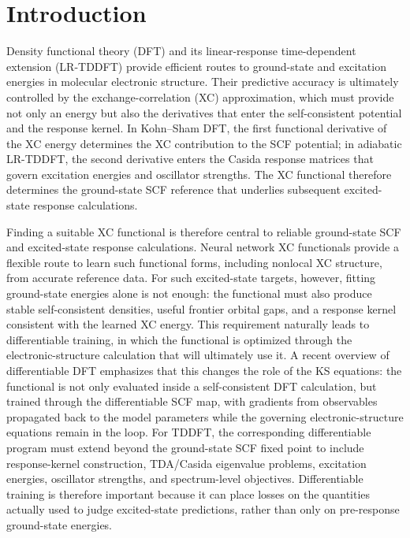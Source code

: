 \section{Introduction}

Density functional theory (DFT) and its linear-response
time-dependent extension (LR-TDDFT) provide efficient routes to
ground-state and excitation energies in molecular electronic
structure.\cite{HohenbergKohn1964,KohnSham1965,RungeGross1984,Casida1995}
Their predictive accuracy is ultimately controlled by the
exchange-correlation (XC) approximation, which must provide not
only an energy but also the derivatives that enter the
self-consistent potential and the response kernel. In Kohn--Sham
DFT, the first functional derivative of the XC energy determines
the XC contribution to the SCF potential; in adiabatic LR-TDDFT,
the second derivative enters the Casida response matrices that
govern excitation energies and oscillator strengths. The XC
functional therefore determines the ground-state SCF reference that
underlies subsequent excited-state response calculations.

Finding a suitable XC functional is therefore
central to reliable ground-state SCF and excited-state response
calculations. Neural network XC functionals provide a flexible route
to learn such functional forms, including nonlocal XC structure,
from accurate reference data.\cite{GLOBE,Schmidt2019NonlocalXCML}
For such excited-state targets, however, fitting ground-state
energies alone is not enough: the functional must also produce
stable self-consistent densities, useful frontier orbital gaps, and
a response kernel consistent with the learned XC energy. This
requirement naturally leads to differentiable training, in which the
functional is optimized through the electronic-structure calculation
that will ultimately use it.\cite{Li2021KohnShamRegularizer} A recent
overview of differentiable DFT emphasizes that this changes the
role of the KS equations: the functional is not only evaluated inside
a self-consistent DFT calculation, but trained through the
differentiable SCF map, with gradients from observables propagated
back to the model parameters while the governing electronic-structure
equations remain in the loop.\cite{vonStrachwitz2026DifferentiableDFT}
For TDDFT, the corresponding differentiable program must extend
beyond the ground-state SCF fixed point to include response-kernel
construction, TDA/Casida eigenvalue problems, excitation energies,
oscillator strengths, and spectrum-level objectives. Differentiable
training is therefore important because it can place losses on the
quantities actually used to judge excited-state predictions, rather
than only on pre-response ground-state energies.

